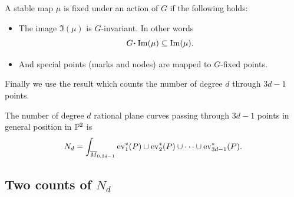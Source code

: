 \documentclass[12pt]{memoir}
\begin{document}
\begin{Prop}\label{prop:who-fixed-maps}
    A stable map $\mu$ is fixed under an action of $G$ if the following holds:
    \begin{itemize}
        \item The image $\Im(\mu)$ is $G$-invariant. In other words 
        $$G\.\Im(\mu)\subseteq\Im(\mu).$$
        \item And special points (marks and nodes) are mapped to $G$-fixed points.
    \end{itemize}
\end{Prop}

Finally we use the result which counts the number of degree $d$ through $3d-1$ points.

\begin{Prop}
    The number of degree $d$ rational plane curves passing through $3d-1$ points in general position in $\mathbb{P}^2$ is 
    $$N_d=\int_{\overline{M}_{0,3d-1}}\operatorname{ev}_1^\ast(P)\cup\operatorname{ev}_2^\ast(P)\cup\cdots\cup\operatorname{ev}_{3d-1}^\ast(P).$$
\end{Prop}

\subsection{Two counts of $N_d$}
\end{document}
